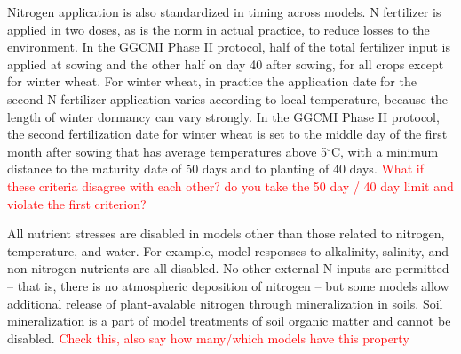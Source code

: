 \documentclass[gmd, manuscript]{copernicus} %
\begin{document}


Nitrogen application is also standardized in timing across models.  N fertilizer is applied in two doses, as is the norm in actual practice, to reduce losses to the environment. In the GGCMI Phase II protocol, half of the total fertilizer input is applied at sowing and the other half on day 40 after sowing, for all crops except for winter wheat. For winter wheat, in practice the application date for the second N fertilizer application varies according to local temperature, because the length of winter dormancy can vary strongly.  In the GGCMI Phase II protocol, the second fertilization date for winter wheat is set to the middle day of the first month after sowing that has average temperatures above 5$^\circ$C, with a minimum distance to the maturity date of 50 days and to planting of 40 days. \textcolor{red}{What if these criteria disagree with each other? do you take the 50 day / 40 day limit and violate the first criterion?}

All nutrient stresses are disabled in models other than those related to nitrogen, temperature, and water. For example, model responses to alkalinity, salinity, and non-nitrogen nutrients are all disabled. 
No other external N inputs are permitted -- that is, there is no atmospheric deposition of nitrogen --  but some models
allow additional release of plant-avalable nitrogen through mineralization in soils. Soil mineralization is a part of model treatments of soil organic matter and cannot be disabled. \textcolor{red}{Check this, also say how many/which models have this property} 
\end{document}
